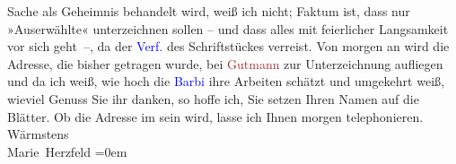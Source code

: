                Sache als Geheimnis behandelt wird, weiß ich nicht; Faktum ist, dass nur
               »Auserwählte« unterzeichnen sollen – und dass alles mit feierlicher {\pb}Langsamkeit vor sich geht –, da der \textcolor{blue}{Verf.}{} des Schriftstückes verreist. Von morgen an wird die Adresse, die bisher \label{T_L02594-1v}\label{T_L02594-1h}
               getragen wurde, bei \textcolor{brown}{Gutmann}{}\ledrightnote{\textcolor{brown}{Gutmann (Konzertdirektion)}} zur Unterzeichnung
               aufliegen und da ich weiß, wie hoch die \textcolor{blue}{Barbi}{}\ledrightnote{\textcolor{blue}{Alice Barbi}} ihre
               Arbeiten schätzt und umgekehrt weiß, wieviel Genuss Sie ihr danken, so hoffe ich, Sie
               setzen Ihren Namen auf die Blätter. Ob die Adresse im \label{K_L02594-11v}\label{K_L02594-11h} sein wird, lasse ich Ihnen morgen telephonieren.\pend
           \pstart
           Wärmstens {\\[\baselineskip]}\spacefill\mbox{Marie Herzfeld}\pend
           \leftskip=0em{}\endnumbering{}  
      